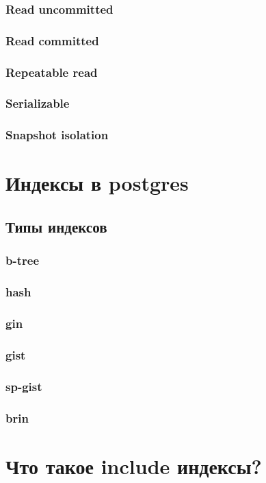 \subsubsection{Read uncommitted}
\subsubsection{Read committed}
\subsubsection{Repeatable read}
\subsubsection{Serializable}
\subsubsection{Snapshot isolation}


\section{Индексы в postgres}

\subsection{Типы индексов}
\subsubsection{b-tree}
\subsubsection{hash}
\subsubsection{gin}
\subsubsection{gist}
\subsubsection{sp-gist}
\subsubsection{brin}

\section{Что такое include индексы?}
